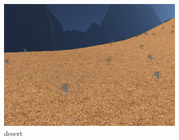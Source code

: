 \documentclass[journal, letterpaper]{IEEEtran}
\begin{document}
\begin{figure}
	\centering
	\includegraphics[width=0.8\textwidth]{images/Planted4}
	\caption{desert}
\end{figure}
\end{document}

